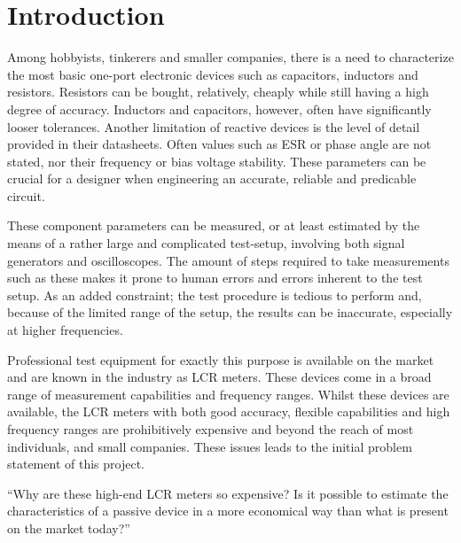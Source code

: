 \chapter{Introduction} \label{ch:Introduction}
Among hobbyists, tinkerers and smaller companies, there is a need to characterize the most basic one-port electronic devices such as capacitors, inductors and resistors. Resistors can be bought, relatively, cheaply while still having a high degree of accuracy. Inductors and capacitors, however, often have significantly looser tolerances. Another limitation of reactive devices is the level of detail provided in their datasheets. Often values such as ESR or phase angle are not stated, nor their frequency or bias voltage stability. These parameters can be crucial for a designer when engineering an accurate, reliable and predicable circuit.

These component parameters can be measured, or at least estimated by the means of a rather large and complicated test-setup, involving both signal generators and oscilloscopes. The amount of steps required to take measurements such as these makes it prone to human errors and errors inherent to the test setup. As an added constraint; the test procedure is tedious to perform and, because of the limited range of the setup, the results can be inaccurate, especially at higher frequencies.

Professional test equipment for exactly this purpose is available on the market and are known in the industry as LCR meters. These devices come in a broad range of measurement capabilities and frequency ranges. Whilst these devices are available, the LCR meters with both good accuracy, flexible capabilities and high frequency ranges are prohibitively expensive and beyond the reach of most individuals, and small companies. These issues leads to the initial problem statement of this project.

“Why are these high-end LCR meters so expensive? Is it possible to estimate the characteristics of a passive device in a more economical way than what is present on the market today?”

